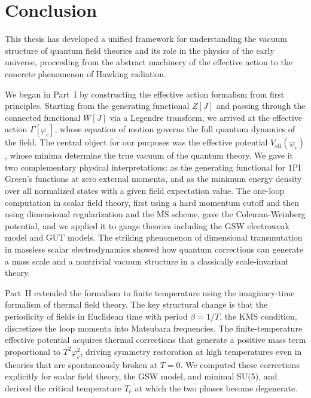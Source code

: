 \chapter*{Conclusion}
\label{ch:conclusion}

This thesis has developed a unified framework for understanding the
vacuum structure of quantum field theories and its role in the physics
of the early universe, proceeding from the abstract machinery of the
effective action to the concrete phenomenon of Hawking radiation.

We began in Part~I by constructing the effective action formalism from
first principles. Starting from the generating functional $Z[J]$ and
passing through the connected functional $W[J]$ via a Legendre
transform, we arrived at the effective action $\Gamma[\varphi_c]$,
whose equation of motion governs the full quantum dynamics of the
field. The central object for our purposes was the effective potential
$V_{\text{eff}}(\varphi_c)$, whose minima determine the true vacuum of
the quantum theory. We gave it two complementary physical
interpretations: as the generating functional for 1PI Green's functions
at zero external momenta, and as the minimum energy density over all
normalized states with a given field expectation value. The one-loop
computation in scalar field theory, first using a hard momentum cutoff
and then using dimensional regularization and the $\overline{\text{MS}}$
scheme, gave the Coleman-Weinberg potential, and we applied it to gauge
theories including the GSW electroweak model and GUT models. The
striking phenomenon of dimensional transmutation in massless scalar
electrodynamics showed how quantum corrections can generate a mass
scale and a nontrivial vacuum structure in a classically scale-invariant
theory.

Part~II extended the formalism to finite temperature using the
imaginary-time formalism of thermal field theory. The key structural
change is that the periodicity of fields in Euclidean time with period
$\beta = 1/T$, the KMS condition, discretizes the loop momenta into
Matsubara frequencies. The finite-temperature effective potential
acquires thermal corrections that generate a positive mass term
proportional to $T^2\varphi_c^2$, driving symmetry restoration at high
temperatures even in theories that are spontaneously broken at $T = 0$.
We computed these corrections explicitly for scalar field theory, the
GSW model, and minimal SU(5), and derived the critical temperature
$T_c$ at which the two phases become degenerate.

